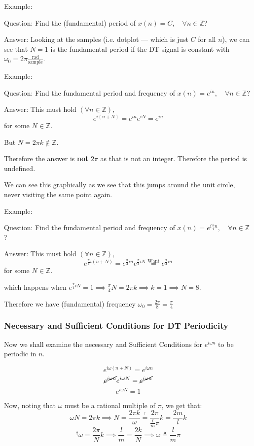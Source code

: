 Example:
\begin{shaded}
Question: Find the (fundamental) period of $x(n)=C, \quad\forall n\in\mathbb Z$?

Answer: 
Looking at the samples (i.e. dotplot — which is just $C$ for all $n$), we can see that $N= 1$ is the fundamental period if the DT signal is constant with $\omega_0=2\pi\frac{\text{rad}}{\text{sample}}$.
\end{shaded}

Example:
\begin{shaded}
Question: Find the fundamental period and frequency of $x(n)=e^{in}, \quad\forall n\in\mathbb Z$?

Answer:
This must hold $(\forall n\in\mathbb Z),$
\[
    e^{i(n+N)} = e^{in}e^{iN} = e^{in}
\]
for some $N\in\mathbb Z$.

But $N=2\pi k\not\in\mathbb Z$.

Therefore the answer is \textbf{not} $2\pi$ as that is not an integer. Therefore the period is undefined.

We can see this graphically as we see that this jumps around the unit circle, never visiting the same point again.
\end{shaded}

Example:
\begin{shaded}
Question: Find the fundamental period and frequency of $x(n)=e^{i\frac\pi4n}, \quad\forall n\in\mathbb Z$?

Answer:
This must hold $(\forall n\in\mathbb Z),$
\[
    e^{\frac\pi4i(n+N)} = e^{\frac\pi4in}e^{\frac\pi4iN} \stackrel{\text{Want}}= e^{\frac\pi4in}
\]
for some $N\in\mathbb Z$.

which happens when $e^{\frac\pi4iN}=1\implies \frac\pi4N=2\pi k\implies k = 1\implies N = 8$.

Therefore we have (fundamental) frequency $\omega_0=\frac{2\pi}8=\frac\pi4$
\end{shaded}

\subsubsection{Necessary and Sufficient Conditions for DT Periodicity}
Now we shall examine the necessary and Sufficient Conditions for $e^{i\omega n}$ to be periodic in $n$.

\[
    e^{i\omega (n+N)} = e^{i\omega n}
\]
\[
    \cancel{e^{i\omega n}}e^{i\omega N} = \cancel{e^{i\omega n}}
\]
\[
    \boxed{e^{i\omega N} = 1}
\]

Now, noting that $\omega$ must be a rational multiple of $\pi$, we get that:
\[
    \omega N = 2\pi k \implies N=\frac{2\pi k}\omega\stackrel{^\dagger}=\frac{2\pi}{\frac l m \pi}k = \frac{2m}l k
\]
\[
    ^\dagger\omega = \frac{2\pi}N k \implies \frac l m = \frac{2k}N\implies \omega\triangleq\frac l m \pi
\]

